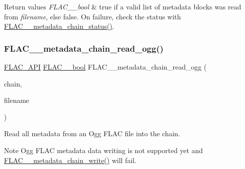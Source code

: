 \begin{DoxyRetVals}{Return values}
{\em F\+L\+A\+C\+\_\+\+\_\+bool} & {\ttfamily true} if a valid list of metadata blocks was read from {\itshape filename}, else {\ttfamily false}. On failure, check the status with \mbox{\hyperlink{group__flac__metadata__level2_ga3d030e216a6517f23372bb76f0639127}{F\+L\+A\+C\+\_\+\+\_\+metadata\+\_\+chain\+\_\+status()}}. \\
\hline
\end{DoxyRetVals}
\mbox{\label{group__flac__metadata__level2_gae7b34f2929bedea0e14ac14aca253a40}} 
\subsubsection{\texorpdfstring{FLAC\_\_metadata\_chain\_read\_ogg()}{FLAC\_\_metadata\_chain\_read\_ogg()}}
{\footnotesize\ttfamily \mbox{\hyperlink{group__flac__export_ga56ca07df8a23310707732b1c0007d6f5}{F\+L\+A\+C\+\_\+\+A\+PI}} \mbox{\hyperlink{ordinals_8h_a95103469f1cbd78b8cf250194985b34e}{F\+L\+A\+C\+\_\+\+\_\+bool}} F\+L\+A\+C\+\_\+\+\_\+metadata\+\_\+chain\+\_\+read\+\_\+ogg (\begin{DoxyParamCaption}\item[{\mbox{\hyperlink{group__flac__metadata__level2_gaec6993c60b88f222a52af86f8f47bfdf}{F\+L\+A\+C\+\_\+\+\_\+\+Metadata\+\_\+\+Chain}} $\ast$}]{chain,  }\item[{const char $\ast$}]{filename }\end{DoxyParamCaption})}

Read all metadata from an Ogg F\+L\+AC file into the chain.

\begin{DoxyNote}{Note}
Ogg F\+L\+AC metadata data writing is not supported yet and \mbox{\hyperlink{group__flac__metadata__level2_gaa15ead7230217de8e79f4af822cda490}{F\+L\+A\+C\+\_\+\+\_\+metadata\+\_\+chain\+\_\+write()}} will fail.
\end{DoxyNote}

